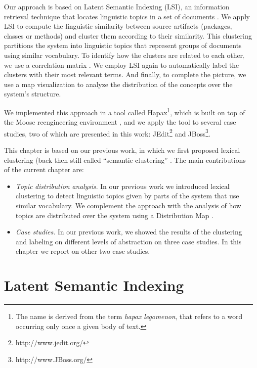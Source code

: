 Our approach is based on Latent Semantic Indexing (LSI), an information retrieval technique that locates linguistic topics in a set of documents \cite{Deer90a,Marc04a}. We apply LSI to compute the linguistic similarity between source artifacts (\eg packages, classes or methods) and cluster them according to their similarity. This clustering partitions the system into linguistic topics that represent groups of documents using similar vocabulary. To identify how the clusters are related to each other, we use a correlation matrix \cite{Ling73a}. We employ LSI again to automatically label the clusters with their most relevant terms. And finally, to complete the picture, we use a map visualization to analyze the distribution of the concepts over the system's structure.

We implemented this approach in a tool called Hapax\footnote{The name is derived from the term \emph{hapax legomenon}, that refers to a word occurring only once a given body of text.}, which is built on top of the Moose reengineering environment \cite{Duca05a,Nier05c}, and we apply the tool to several case studies, two of which are presented in this work: JEdit\footnote{http://www.jedit.org/} and JBoss\footnote{http://www.JBoss.org/}.

This chapter is based on our previous work, in which we first proposed lexical clustering (back then still called ``semantic clustering'' \cite{Kuhn05a}. The main contributions of the current chapter are:
\begin{itemize}

\item \emph{Topic distribution analysis.} In our previous work we introduced lexical clustering to detect linguistic topics given by parts of the system that use similar vocabulary. We complement the approach with the analysis of how topics are distributed over the system using a Distribution Map \cite{Duca06c}.

\item \emph{Case studies.} In our previous work, we showed the results of the clustering and labeling on different levels of abstraction on three case studies. In this chapter we report on other two case studies.
\end{itemize}

\section{Latent Semantic Indexing}\label{sec:LSI}

